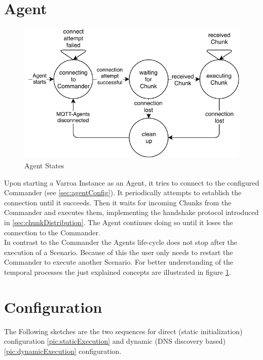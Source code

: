 \section{Agent}
\begin{figure}[H]
	\begin{center}
	\includegraphics[scale=0.9]{Resources/PDF/AgentStates}
	\caption{Agent States}
	\label{pic:AgentStates}
	\end{center}
\end{figure}
Upon starting a Varroa Instance as an Agent, it tries to connect to the configured Commander (see \ref{sec:agentConfig}).
It periodically attempts to establish the connection until it succeeds.
Then it waits for incoming Chunks from the Commander and executes them, implementing the handshake protocol introduced in \ref{sec:chunkDistribution}.
The Agent continues doing so until it loses the connection to the Commander.\\
In contrast to the Commander the Agents life-cycle does not stop after the execution of a Scenario.
Because of this the user only needs to restart the Commander to execute another Scenario.
For better understanding of the temporal processes the just explained concepts are illustrated in figure \ref{pic:AgentStates}.

\section{Configuration}
The Following sketches are the two sequences for direct (static initialization) configuration \ref{pic:staticExecution} and dynamic (DNS discovery based) \ref{pic:dynamicExecution} configuration.

